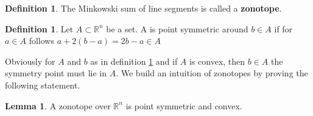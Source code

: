 \documentclass{article}
\theoremstyle{definition}
\newtheorem{lemma}[theorem]{Lemma}
\newtheorem{definition}[theorem]{Definition}
\begin{document}
\begin{definition}
The Minkowski sum of line segments is called a \textbf{zonotope}.
\end{definition}

\begin{definition}
\label{def:point_sym}
Let $A \subset \mathbb{R}^{n}$ be a set. A is point symmetric around $b \in A$ if for $a \in A$ follows $a + 2(b-a)=2b-a \in A$
\end{definition}

Obviously for $A$ and $b$ as in definition \ref{def:point_sym} and if $A$ is convex, then $b \in A$ the symmetry point must lie in $A$. We build an intuition of zonotopes by proving the following statement.

\begin{lemma}
\label{lem:zon_sym_conv}
A zonotope over $\mathbb{R}^{n}$ is point symmetric and convex.
\end{lemma}
\end{document}
